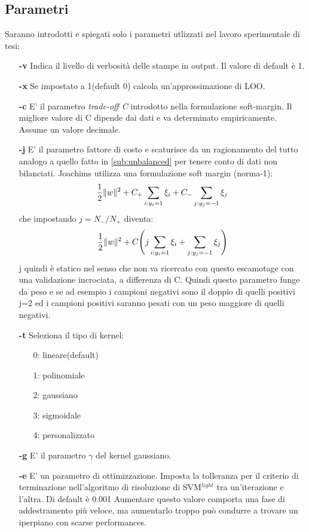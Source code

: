 \subsection{Parametri}
Saranno introdotti e spiegati solo i parametri utlizzati nel lavoro sperimentale di tesi:\\
\begin{itemize}
\item [\textbf{-v}] Indica il livello di verbosità delle stampe in output. Il valore di default è 1.
\item [\textbf{-x}] Se impostato a 1(default 0) calcola un'approssimazione di LOO.
\item [\textbf{-c}]  E' il parametro \textit{trade-off C} introdotto nella formulazione soft-margin. Il migliore valore di C dipende dai dati e va determinato empiricamente. Assume un valore decimale.
\item [\textbf{-j}] E' il parametro fattore di costo e scaturisce da un ragionamento del tutto analogo a quello fatto in \ref{sub:unbalanced} per tenere conto di dati non bilanciati. Joachims utilizza una formulazione  soft margin (norma-1):\begin{equation*}\frac{1}{2}\lVert w\rVert^2 + C_{+}\sum_{i:y_i=1}\xi_i + C_{-}\sum_{j:y_j=-1}\xi_j\end{equation*} che impostando $j=N_-/N_+$ diventa:
\begin{equation*}
\frac{1}{2}\lVert w\rVert^2 +C\Biggl(j\sum_{i:y_i=1}\xi_i + \sum_{j:y_j=-1}\xi_j\Biggl)
\end{equation*}
j quindi è statico nel senso che non va ricercato con questo escamotage con una validazione incrociata, a differenza di C. Quindi questo parametro funge da peso e se ad esempio i campioni negativi sono il doppio di quelli positivi j=2 ed i campioni positivi saranno pesati con un peso maggiore di quelli negativi.
\item [\textbf{-t}] Seleziona il tipo di kernel:
\begin{itemize}
\item[0:] lineare(default)
\item[1:] polinomiale
\item[2:] gaussiano
\item[3:] sigmoidale
\item[4:] personalizzato

\end{itemize}
\item[\textbf{-g}] E' il parametro $\gamma$ del kernel gaussiano.
\item[\textbf{-e}] E' un parametro di ottimizzazione. Imposta la tolleranza per il criterio di terminazione nell'algoritmo di risoluzione di SVM$^{light}$ tra un'iterazione e l'altra. Di default è 0.001 Aumentare questo valore comporta una fase di addestramento più veloce, ma aumentarlo troppo può condurre a trovare un iperpiano con scarse performances.
\end{itemize}
 

